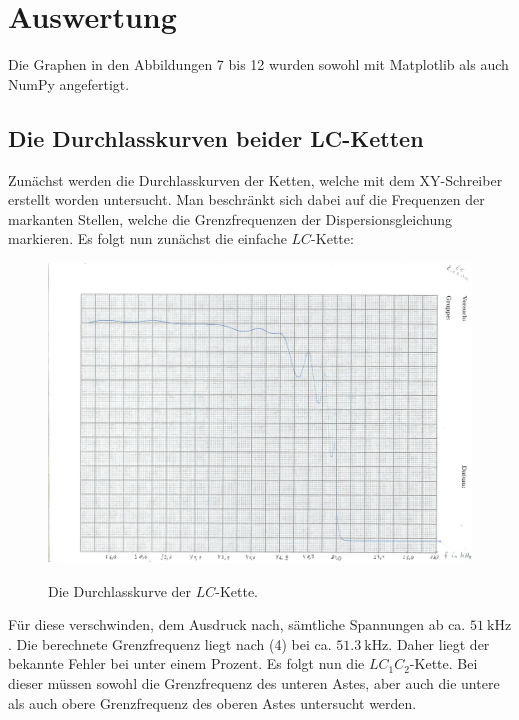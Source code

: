 
\section{Auswertung}
\label{sec:Auswertung}
Die Graphen in den Abbildungen 7 bis 12 wurden sowohl mit Matplotlib \cite{matplotlib} als auch NumPy \cite{numpy} angefertigt.

\subsection{Die Durchlasskurven beider LC-Ketten}
Zunächst werden die Durchlasskurven der Ketten, welche mit dem XY-Schreiber
 erstellt worden untersucht. Man beschränkt sich dabei auf die Frequenzen der
  markanten Stellen, welche die Grenzfrequenzen der Dispersionsgleichung
	 markieren. Es folgt nun zunächst die einfache $LC$-Kette:

   \begin{figure}[H]
   	\centering
   	\caption{Die Durchlasskurve der $LC$-Kette.}
   	\includegraphics[width=\linewidth-70pt,height=\textheight-70pt,keepaspectratio]{content/Scans/LC.png}
   	\label{fig:Lc}
   \end{figure}

	 Für diese verschwinden, dem Ausdruck nach, sämtliche Spannungen ab ca.
	  $\SI{51}{\kilo\hertz}$. Die berechnete Grenzfrequenz liegt nach (4) bei
		 ca. $\SI{51,3}{\kilo\hertz}$. Daher liegt der bekannte Fehler bei
		  unter einem Prozent. Es folgt nun die $LC_1C_2$-Kette. Bei dieser müssen
			 sowohl die Grenzfrequenz des unteren Astes, aber auch die untere als auch obere Grenzfrequenz des
			  oberen Astes untersucht werden.

